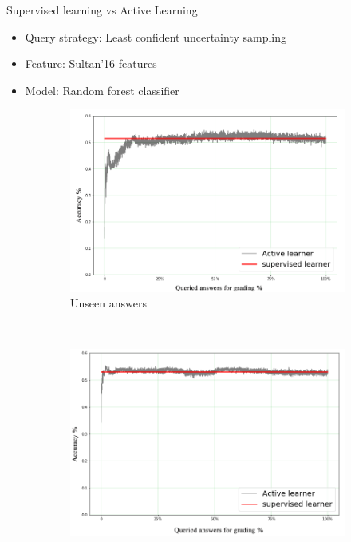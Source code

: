 \documentclass{beamer}
\begin{document}
\begin{frame}{Supervised learning vs Active Learning}
\begin{itemize}
	\item Query strategy: Least confident uncertainty sampling
	\item Feature: Sultan'16 features
	\item Model: Random forest classifier
\end{itemize}
			\begin{figure}[!htb]
				\begin{subfigure}[b]{0.32\textwidth}
					\includegraphics[width=\textwidth]{images/Unseen_Answers}
									\caption{Unseen answers}
					\label{mohlergrades}
				\end{subfigure}
			~
				\begin{subfigure}[b]{0.30\textwidth}
					\includegraphics[width=\textwidth]{images/Unseen_Questions}

\end{subfigure}
\end{figure}
\end{frame}
\end{document}
